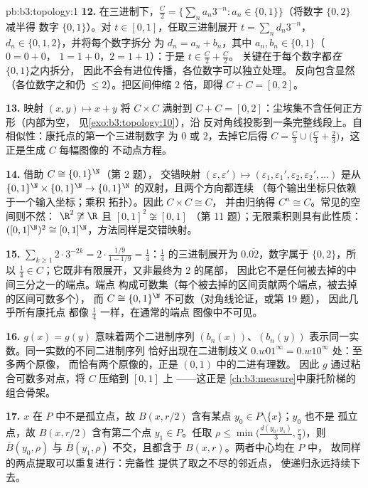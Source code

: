 \begin{solution}{pb:b3:topology:1}
\textbf{12.} 在三进制下，$\frac C2 = \{\sum_na_n3^{-n} : a_n
\in \{0, 1\}\}$（将数字 $\{0,2\}$ 减半得
数字 $\{0,1\}$）。对 $t \in [0,1]$，任取三进制展开 $t =
\sum_nd_n3^{-n}$，$d_n \in \{0,1,2\}$，并将每个数字拆分
为 $d_n = a_n + b_n$，其中 $a_n, b_n \in \{0,1\}$（$0 = 0{+}0$，
$1 = 1{+}0$，$2 = 1{+}1$）：于是 $t \in \frac C2 + \frac C2$。
关键在于每个数字都\emph{在}$\{0,1\}$之内拆分，
因此不会有进位传播，各位数字可以独立处理。
反向包含显然（各位数字之和仍
$\leq 2$）。把区间伸缩 $2$ 倍，即得 $C + C = [0,2]$。

\textbf{13.} 映射 $(x, y) \mapsto x + y$ 将 $C \times C$
满射到 $C + C = [0,2]$：尘埃集不含任何正方形（内部为空，
见\cref{exo:b3:topology:10}），沿
反对角线投影到一条完整线段上。自相似性：康托点的第一个三进制数字
为 $0$ 或 $2$，去掉它后得
$C = \frac C3 \cup \bigl(\frac C3 +
\frac23\bigr)$，这正是生成 $C$ 每幅图像的
不动点方程。

\textbf{14.} 借助 $C \cong \{0,1\}^\N$（第 2 题），
交错映射 $(\varepsilon, \varepsilon') \mapsto
(\varepsilon_1, \varepsilon_1', \varepsilon_2,
\varepsilon_2', \dots)$ 是从
$\{0,1\}^\N\times\{0,1\}^\N \to \{0,1\}^\N$ 的双射，且两个方向都连续
（每个输出坐标只依赖于一个输入坐标；乘积
拓扑）。因此 $C\times C \cong C$，
并由归纳得 $C^n \cong C$。常见的空间则不然：
$\R^2 \not\cong \R$ 且 $[0,1]^2 \not\cong [0,1]$
（第 11 题）；无限乘积则具有此性质：$([0,1]^\N)^2 \cong
[0,1]^\N$，方法同样是交错映射。

\textbf{15.} $\sum_{k\geq1}2\cdot3^{-2k} = 2\cdot\frac{1/9}{1
- 1/9} = \frac14$：$\frac14$ 的三进制展开为
$0.\overline{02}$，数字属于 $\{0,2\}$，所以 $\frac14 \in
C$；它既非有限展开，又非最终为 $2$ 的尾部，
因此它不是任何被去掉的中间三分之一的端点。端点
构成可数集（每个被去掉的区间贡献两个端点，被去掉的区间可数多个），
而 $C \cong \{0,1\}^\N$ 不可数（对角线论证，或第 19 题），
因此几乎所有康托点
都像 $\frac14$ 一样，在通常的端点
图像中不可见。

\textbf{16.} $g(x) = g(y)$ 意味着两个二进制序列
$(b_n(x))$、$(b_n(y))$ 表示同一实数。同一实数的不同二进制序列
恰好出现在二进制歧义
$0.w01^\infty = 0.w10^\infty$ 处：至多两个原像，
而恰有两个原像的，正是 $(0,1)$ 中的二进有理数。
因此 $g$ 通过粘合可数多对点，将 $C$ 压缩到 $[0,1]$ 上
——这正是
\cref{ch:b3:measure}中康托阶梯的组合骨架。

\textbf{17.} $x$ 在 $P$ 中不是孤立点，故 $B(x, r/2)$
含有某点 $y_0 \in P \setminus \{x\}$；$y_0$ 也不是
孤立点，故 $B(x, r/2)$ 含有第二个点 $y_1
\in P$。任取 $\rho \leq \min\bigl(\frac{d(y_0,y_1)}3,
\frac r4\bigr)$，则 $\bar B(y_0, \rho)$ 与 $\bar B(y_1,
\rho)$ 不交，且都含于 $B(x, r)$。两者中心均在 $P$ 中，
故同样的两点提取可以重复进行：完备性
提供了取之不尽的邻近点，
使递归永远持续下去。


\end{solution}

